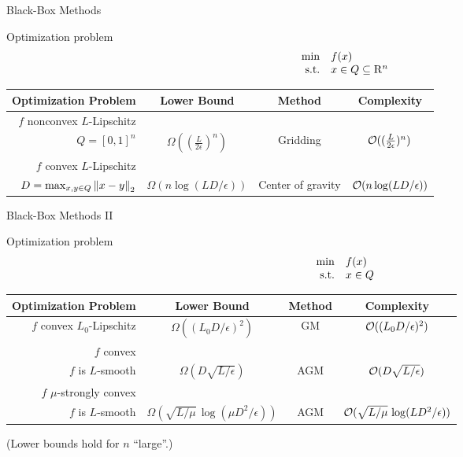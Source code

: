 \documentclass[9pt]{beamer}
\begin{document}
\begin{frame}{Black-Box Methods}

  Optimization problem
  \[
    \begin{array}{rl}
      \min & f(x) \\
      \mathrm{s.t.} & x\in Q\subseteq\mathrm{R}^n
    \end{array}
  \]

  \vfill
  
  \begin{center}
    \begin{tabular}{rccc}
      \hline
      Optimization Problem & Lower Bound & Method & Complexity \\[0.5em]
      \hline
      $f$ nonconvex $L$-Lipschitz \\
      $Q=[0, 1]^n$ & $\Omega( (\frac{L}{2\epsilon})^n)$ & Gridding & $\mathcal O( (\frac{L}{2\epsilon})^n)$ \\[0.5em]
      \hline
      $f$ convex $L$-Lipschitz \\
      $D = \max_{x,y\in Q} \left\|x-y\right\|_2$
                                      & $\Omega(n \log(LD/\epsilon))$ & Center of gravity & $\mathcal O(n \log(LD/\epsilon))$ \\
      \hline
    \end{tabular}
  \end{center}

\end{frame}

\begin{frame}{Black-Box Methods II}

  Optimization problem
  \[
    \begin{array}{rl}
      \min & f(x) \\
      \mathrm{s.t.} & x\in Q
    \end{array}
  \]

  \vfill
  
  \begin{center}
    \begin{tabular}{rccc}
      \hline
      Optimization Problem & Lower Bound & Method & Complexity \\[0.5em]
      \hline
      $f$ convex $L_0$-Lipschitz & $\Omega((L_0D/\epsilon)^2)$ & GM & $\mathcal O((L_0D/\epsilon)^2)$ \\[0.5em]
      \hline
      $f$ convex\\
      $f$ is $L$-smooth & $\Omega(D\sqrt{L/\epsilon})$ & AGM & $\mathcal O(D\sqrt{L/\epsilon})$ \\[0.5em]
      \hline
      $f$ $\mu$-strongly convex  \\
      $f$ is $L$-smooth & $\Omega(\sqrt{L/\mu}\,\log(\mu D^2/\epsilon))$ & AGM & $\mathcal O(\sqrt{L/\mu}\,\log(LD^2/\epsilon))$ \\[0.5em]
      \hline
    \end{tabular}
  \end{center}

  \vfill

  {\small (Lower bounds hold for $n$ ``large''.)}

\end{frame}
\end{document}
